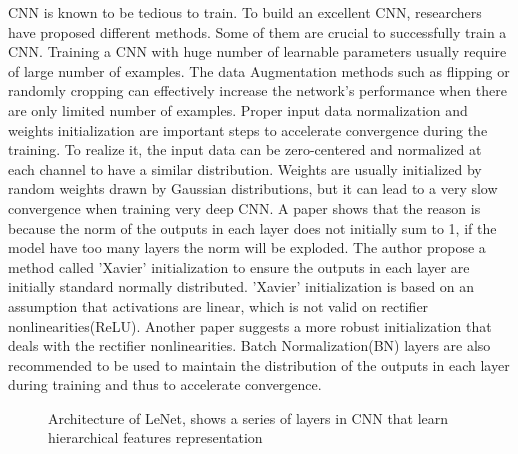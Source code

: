 CNN is known to be tedious to train. To build an excellent CNN, researchers have proposed different methods. Some of them are crucial to successfully train a CNN. Training a CNN with huge number of learnable parameters usually require of large number of examples. The data Augmentation methods such as flipping or randomly cropping can effectively increase the network's performance when there are only limited number of examples. Proper input data normalization and weights initialization are important steps to accelerate convergence during the training. To realize it, the input data can be zero-centered and normalized at each channel to have a similar distribution. Weights are usually initialized by random weights drawn by Gaussian distributions\cite{krizhevsky2012imagenet}, but it can lead to a very slow convergence when training very deep CNN. A paper\cite{glorot2010understanding} shows that the reason is because the norm of the outputs in each layer does not initially sum to 1, if the model have too many layers the norm will be exploded. The author propose a method called 'Xavier' initialization to ensure the outputs in each layer are initially standard normally distributed. 'Xavier' initialization is based on an assumption that activations are linear, which is not valid on rectifier nonlinearities(ReLU). Another paper\cite{he2015delving} suggests a more robust initialization that deals with the rectifier nonlinearities. Batch Normalization(BN) layers are also recommended to be used to maintain the distribution of the outputs in each layer during training and thus to accelerate convergence\cite{krizhevsky2012imagenet}. 

\begin{figure}
	\begin{center}
		\hsize {}
	\end{center}
	\caption{Architecture of LeNet, shows a series of layers in CNN that learn hierarchical features representation \cite{lecun1998gradient} }
	\label{fig:LeNet}
\end{figure}




